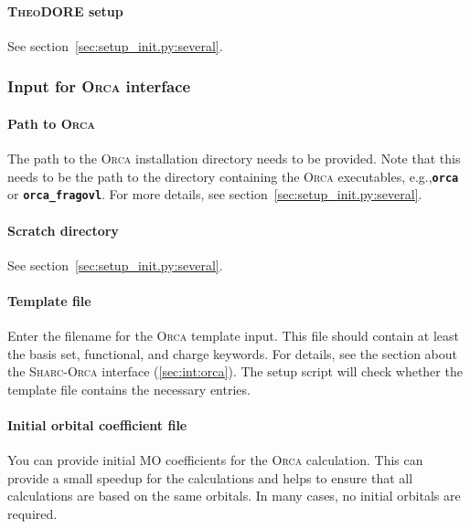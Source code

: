 \documentclass[a4paper,10pt,DIV=15,openany]{scrbook}
\newcommand{\sharc}{\textsc{Sharc}}
\newcommand{\ttt}[1]{\textbf{\texttt{#1}}}
\begin{document}
\paragraph{\textsc{TheoDORE} setup}

See section~\ref{sec:setup_init.py:several}. 


\subsubsection{Input for \textsc{Orca} interface}\label{sec:setup_init.py:orca}

\paragraph{Path to \textsc{Orca}}

The path to the \textsc{Orca} installation directory needs to be provided.
Note that this needs to be the path to the directory containing the \textsc{Orca} executables, e.g.,\ttt{orca} or \ttt{orca\_fragovl}.
For more details, see section~\ref{sec:setup_init.py:several}.

\paragraph{Scratch directory}

See section~\ref{sec:setup_init.py:several}.

\paragraph{Template file}

Enter the filename for the \textsc{Orca} template input. This file should contain at least the basis set, functional, and charge keywords. For details, see the section about the \sharc-\textsc{Orca} interface (\ref{sec:int:orca}). The setup script will check whether the template file contains the necessary entries. 

\paragraph{Initial orbital coefficient file}

You can provide initial MO coefficients for the \textsc{Orca} calculation. This can provide a small speedup for the calculations and helps to ensure that all calculations are based on the same orbitals.
In many cases, no initial orbitals are required.
\end{document}
